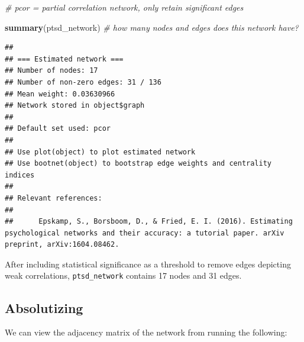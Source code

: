 \documentclass[
]{book}
\newenvironment{Shaded}{\begin{snugshade}}{\end{snugshade}}
\newcommand{\CommentTok}[1]{\textcolor[rgb]{0.56,0.35,0.01}{\textit{#1}}}
\newcommand{\FunctionTok}[1]{\textcolor[rgb]{0.13,0.29,0.53}{\textbf{#1}}}
\newcommand{\NormalTok}[1]{#1}
\newcommand{\SpecialCharTok}[1]{\textcolor[rgb]{0.81,0.36,0.00}{\textbf{#1}}}
\begin{document}
\begin{Shaded}
\begin{Highlighting}[]
\CommentTok{\# pcor = partial correlation network, only retain significant edges }

\FunctionTok{summary}\NormalTok{(ptsd\_network) }\CommentTok{\# how many nodes and edges does this network have?}
\end{Highlighting}
\end{Shaded}

\begin{verbatim}
## 
## === Estimated network ===
## Number of nodes: 17 
## Number of non-zero edges: 31 / 136 
## Mean weight: 0.03630966 
## Network stored in object$graph 
##  
## Default set used: pcor 
##  
## Use plot(object) to plot estimated network 
## Use bootnet(object) to bootstrap edge weights and centrality indices 
## 
## Relevant references:
## 
##      Epskamp, S., Borsboom, D., & Fried, E. I. (2016). Estimating psychological networks and their accuracy: a tutorial paper. arXiv preprint, arXiv:1604.08462.
\end{verbatim}

After including statistical significance as a threshold to remove edges depicting weak correlations, \texttt{ptsd\_network} contains 17 nodes and 31 edges.

\subsection{Absolutizing}\label{absolutizing}

We can view the adjacency matrix of the network from running the following:

\begin{Shaded}
\end{Shaded}
\end{document}
